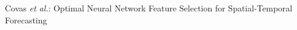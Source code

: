 \documentclass[journal]{IEEEtran}
\begin{document}
%
%



\markboth{}%
{Covas \MakeLowercase{\textit{et al.}}: Optimal Neural Network Feature Selection for Spatial-Temporal Forecasting}
%











\maketitle
\end{document}
